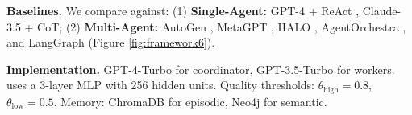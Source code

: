 \documentclass{article}
\theoremstyle{plain}
\theoremstyle{definition}
\theoremstyle{remark}
\begin{document}
%		
%	

%	

\textbf{Baselines.} We compare against: (1) \textbf{Single-Agent:} GPT-4 + ReAct \citep{yao2023react}, Claude-3.5 + CoT; (2) \textbf{Multi-Agent:} AutoGen \citep{wu2023autogen}, MetaGPT \citep{hong2024metagpt}, HALO \citep{chen2025halo}, AgentOrchestra \citep{liu2025agentorchestra}, and LangGraph \citep{langchain2024langgraph} (Figure \ref{fig:framework6}).

\textbf{Implementation.} GPT-4-Turbo for coordinator, GPT-3.5-Turbo for workers. \car{} uses a 3-layer MLP with 256 hidden units. Quality thresholds: $\theta_{\text{high}} = 0.8$, $\theta_{\text{low}} = 0.5$. Memory: ChromaDB for episodic, Neo4j for semantic.
\end{document}
